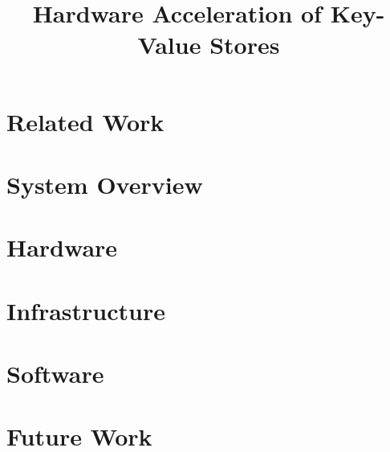 \documentclass[conference]{IEEEtran}
\title{Hardware Acceleration of Key-Value Stores}
\author{
	\IEEEauthorblockN{Howard Mao}
	\IEEEauthorblockA{\email{zhemao@eecs.berkeley.edu}}
	\and
	\IEEEauthorblockN{Sagar Karandikar}
	\IEEEauthorblockA{\email{skarandikar@berkeley.edu}}
	\and
	\IEEEauthorblockN{Albert Ou}
	\IEEEauthorblockA{\email{aou@eecs.berkeley.edu}}
	\and
	\IEEEauthorblockN{Soumya Basu}
	\IEEEauthorblockA{\email{soumyab@berkeley.edu}}
}
\begin{document}
\maketitle




\section{Related Work}



\section{System Overview}



\section{Hardware}





\section{Infrastructure}



\section{Software}



\section{Future Work}


\nocite{*}
\printbibliography
\end{document}
